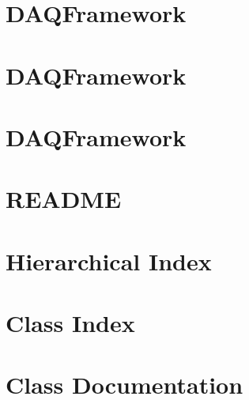 \let\mypdfximage\pdfximage\def\pdfximage{\immediate\mypdfximage}\documentclass[twoside]{book}
\newcommand{\+}{\discretionary{\mbox{\scriptsize$\hookleftarrow$}}{}{}}
\newcommand{\clearemptydoublepage}{%
  \newpage{\pagestyle{empty}\cleardoublepage}%
}
\begin{document}
\chapter{DAQFramework}
\label{md_UserTools_ServiceDiscoverySource_README}

\chapter{DAQFramework}
\label{md_UserTools_template_README}

\chapter{DAQFramework}
\label{md_UserTools_WebSocket_README}

\chapter{README}
\label{md_DataModel_README}

\chapter{Hierarchical Index}

\chapter{Class Index}

\chapter{Class Documentation}





























\backmatter
\newpage
{}
\clearemptydoublepage
{}
\printindex
\end{document}
